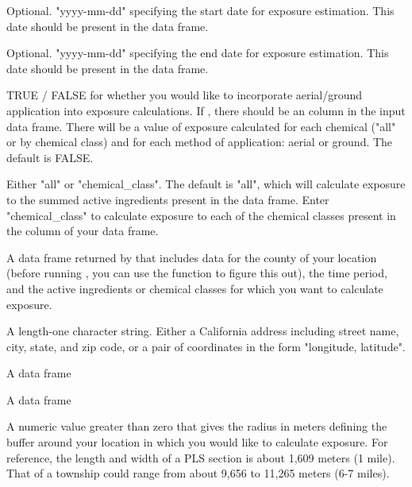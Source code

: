 \documentclass[a4paper]{book}
\begin{document}
\begin{Arguments}
\begin{ldescription}
\item[\code{start\_date}] Optional. "yyyy-mm-dd" specifying the start date for
exposure estimation. This date should be present in the 
data frame.

\item[\code{end\_date}] Optional. "yyyy-mm-dd" specifying the end date for exposure
estimation. This date should be present in the 
data frame.

\item[\code{aerial\_ground}] TRUE / FALSE for whether you would like to
incorporate aerial/ground application into exposure calculations. If
, there should be an 
column in the input  data frame. There will be a value of
exposure calculated for each chemical ("all" or by chemical class) and for
each method of application: aerial or ground. The default is FALSE.

\item[\code{chemicals}] Either "all" or "chemical\_class". The default is "all", which
will calculate exposure to the summed active ingredients present in the
 data frame. Enter "chemical\_class" to calculate
exposure to each of the chemical classes present in the 
column of your  data frame.

\item[\code{clean\_pur\_df}] A data frame returned by  that
includes data for the county of your location (before running
, you can use the 
function to figure this out), the time period, and the active ingredients
or chemical classes for which you want to calculate exposure.

\item[\code{location}] A length-one character string. Either a California address
including street name, city, state, and zip code, or a pair of coordinates
in the form "longitude, latitude".

\item[\code{pls\_percents}] A data frame

\item[\code{pur\_filt}] A data frame

\item[\code{radius}] A numeric value greater than zero that gives the radius in meters
defining the buffer around your location in which you would like to
calculate exposure. For reference, the length and width of a PLS section is
about 1,609 meters (1 mile). That of a township could range from about
9,656 to 11,265 meters (6-7 miles).
\end{ldescription}
\end{Arguments}
\end{document}
